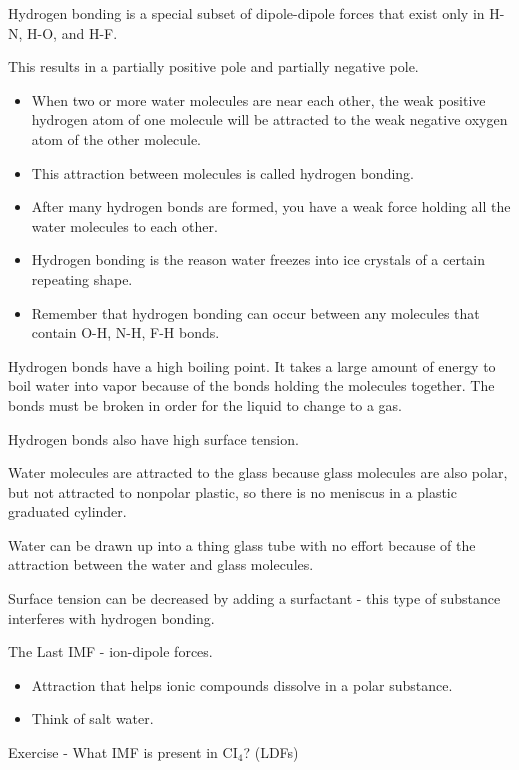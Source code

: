 \documentclass[../hchem.tex]{subfiles}
\begin{document}
Hydrogen bonding is a special subset of dipole-dipole forces that exist only in H-N, H-O, and H-F.

This results in a partially positive pole and partially negative pole.

\begin{itemize}
    \item When two or more water molecules are near each other, the weak positive hydrogen atom of one molecule will be attracted to the weak negative oxygen atom of the other molecule.
    \item This attraction between molecules is called hydrogen bonding.
    \item After many hydrogen bonds are formed, you have a weak force holding all the water molecules to each other.
    \item Hydrogen bonding is the reason water freezes into ice crystals of a certain repeating shape.
    \item Remember that hydrogen bonding can occur between any molecules that contain O-H, N-H, F-H bonds.
\end{itemize}
Hydrogen bonds have a high boiling point. It takes a large amount of energy to boil water into vapor because of the bonds holding the molecules together.
The bonds must be broken in order for the liquid to change to a gas.

Hydrogen bonds also have high surface tension.

Water molecules are attracted to the glass because glass molecules are also polar, but not attracted to nonpolar plastic, so there is no meniscus in a plastic graduated cylinder.

Water can be drawn up into a thing glass tube with no effort because of the attraction between the water and glass molecules.

Surface tension can be decreased by adding a surfactant - this type of substance interferes with hydrogen bonding.

The Last IMF - ion-dipole forces.
\begin{itemize}
    \item Attraction that helps ionic compounds dissolve in a polar substance.
    \item Think of salt water.
\end{itemize}

Exercise - What IMF is present in CI$_4$? (LDFs)
\end{document}
